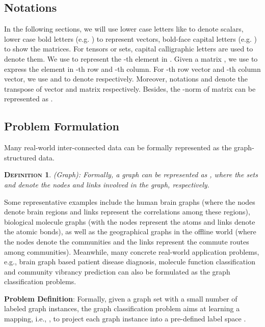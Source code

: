 \documentclass{article} \usepackage{iclr2020_conference,times}
\newtheorem{defn}{\textsc{Definition}}
\begin{document}
\subsection{Notations}
\vspace*{-5pt}
In the following sections, we will use lower case letters like  to denote scalars, lower case bold letters  (e.g. ) to represent vectors, bold-face capital letters (e.g. ) to show the matrices. For tensors or sets, capital calligraphic letters are used to denote them. We use  to represent the -th element in . Given a matrix , we use  to express the element in -th row and -th column.  For -th row vector and -th column vector, we use  and  to denote respectively. Moreover, notations  and  denote the transpose of vector  and matrix  respectively. Besides, the -norm of matrix  can be represented as .\\

\vspace*{-15pt}
\subsection{Problem Formulation}
\vspace*{-5pt}
Many real-world inter-connected data can be formally represented as the graph-structured data.
\begin{defn}  (Graph): Formally, a graph can be represented as , where the sets  and  denote the nodes and links involved in the graph, respectively. 
\end{defn}
\vspace*{-10pt}
Some representative examples include the human brain graphs (where the nodes denote brain regions and links represent the correlations among these regions), biological molecule graphs (with the nodes represent the atoms and links denote the atomic bonds), as well as the geographical graphs in the offline world (where the nodes denote the communities and the links represent the commute routes among communities). Meanwhile, many concrete real-world application problems, e.g., brain graph based patient disease diagnosis, molecule function classification and community vibrancy prediction can also be formulated as the graph classification problems. 

\noindent \textbf{Problem Definition}: Formally, given a  graph set  with a small number of labeled graph instances, the graph classification problem aims at learning a mapping, i.e., , to project each graph instance into a pre-defined label space . 
\end{document}
